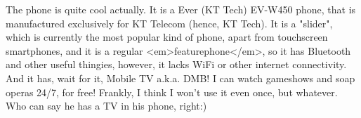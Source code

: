 \begin{post}
\begin{content}
The phone is quite cool actually. It is a Ever (KT Tech) EV-W450 phone, that is manufactured exclusively for KT Telecom (hence, KT Tech). It is a "slider", which is currently the most popular kind of phone, apart from touchscreen smartphones, and it is a regular <em>featurephone</em>, so it has Bluetooth and other useful thingies, however, it lacks WiFi or other internet connectivity. And it has, wait for it, Mobile TV a.k.a. DMB! I can watch gameshows and soap operas 24/7, for free! Frankly, I think I won't use it even once, but whatever. Who can say he has a TV in his phone, right:)
	\end{content}
\end{post}
